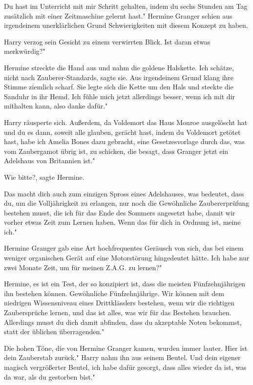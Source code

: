 \glqq Du hast im Unterricht mit mir Schritt gehalten, indem du sechs Stunden am
Tag zusätzlich mit einer Zeitmaschine gelernt hast." Hermine Granger schien aus
irgendeinem unerklärlichen Grund Schwierigkeiten mit diesem Konzept zu haben.

Harry verzog sein Gesicht zu einem verwirrten Blick. \glqq Ist daran etwas
merkwürdig?"

Hermine streckte die Hand aus und nahm die goldene Halskette. \glqq Ich schätze,
nicht nach Zauberer-Standards\grqq{}, sagte sie. Aus irgendeinem Grund klang
ihre Stimme ziemlich scharf. Sie legte sich die Kette um den Hals und steckte
die Sanduhr in ihr Hemd. \glqq Ich fühle mich jetzt allerdings besser, wenn ich
mit dir mithalten kann, also danke dafür."

Harry räusperte sich. \glqq Außerdem, da Voldemort das Haus Monroe ausgelöscht
hat und du es dann, soweit alle glauben, gerächt hast, indem du Voldemort
getötet hast, habe ich Amelia Bones dazu gebracht, eine Gesetzesvorlage durch
das, was vom Zaubergamot übrig ist, zu schicken, die besagt, dass Granger jetzt
ein Adelshaus von Britannien ist."

\glqq Wie bitte?\grqq{}, sagte Hermine.

\glqq Das macht dich auch zum einzigen Spross eines Adelshauses, was bedeutet,
dass du, um die Volljährigkeit zu erlangen, nur noch die Gewöhnliche
Zaubererprüfung bestehen musst, die ich für das Ende des Sommers angesetzt habe,
damit wir vorher etwas Zeit zum Lernen haben. Wenn das für dich in Ordnung ist,
meine ich."

Hermine Granger gab eine Art hochfrequentes Geräusch von sich, das bei einem
weniger organischen Gerät auf eine Motorstörung hingedeutet hätte. \glqq Ich
habe nur zwei Monate Zeit, um für meinen Z.A.G. zu lernen?"

\glqq Hermine, es ist ein Test, der so konzipiert ist, dass die meisten
Fünfzehnjährigen ihn bestehen können. Gewöhnliche Fünfzehnjährige. Wir können
mit dem niedrigen Wissensniveau eines Drittklässlers bestehen, wenn wir die
richtigen Zaubersprüche lernen, und das ist alles, was wir für das Bestehen
brauchen. Allerdings musst du dich damit abfinden, dass du akzeptable Noten
bekommst, statt der üblichen überragenden."

Die hohen Töne, die von Hermine Granger kamen, wurden immer lauter. \glqq Hier
ist dein Zauberstab zurück." Harry nahm ihn aus seinem Beutel. \glqq Und dein
eigener magisch vergrößerter Beutel, ich habe dafür gesorgt, dass alles wieder
da ist, was da war, als du gestorben bist."

